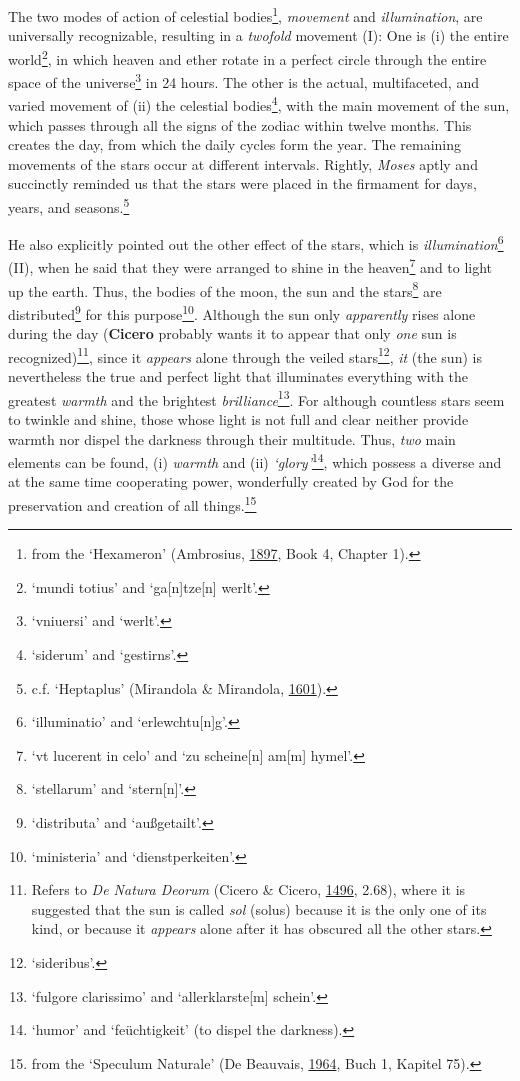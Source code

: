 \documentclass[
]{article}
\begin{document}
The two modes of action of celestial bodies\footnote{from the
  `Hexameron' (Ambrosius,
  \href{https://books.google.com/books?id=L1DbnAAACAAJ}{1897}, Book 4,
  Chapter 1).}, \emph{movement} and \emph{illumination}, are universally
recognizable, resulting in a \emph{twofold} movement (I): One is (i) the
entire world\footnote{`mundi totius' and `ga{[}n{]}tze{[}n{]} werlt'.},
in which heaven and ether rotate in a perfect circle through the entire
space of the universe\footnote{`vniuersi' and `werlt'.} in 24 hours. The
other is the actual, multifaceted, and varied movement of (ii) the
celestial bodies\footnote{`siderum' and `gestirns'.}, with the main
movement of the sun, which passes through all the signs of the zodiac
within twelve months. This creates the day, from which the daily cycles
form the year. The remaining movements of the stars occur at different
intervals. Rightly, \emph{Moses} aptly and succinctly reminded us that
the stars were placed in the firmament for days, years, and
seasons.\footnote{c.f. `Heptaplus' (Mirandola \& Mirandola,
  \href{https://doi.org/10.3931/e-rara-61217}{1601}).}

He also explicitly pointed out the other effect of the stars, which is
\emph{illumination}\footnote{`illuminatio' and `erlewchtu{[}n{]}g'.}
(II), when he said that they were arranged to shine in the
heaven\footnote{`vt lucerent in celo' and `zu scheine{[}n{]} am{[}m{]}
  hymel'.} and to light up the earth. Thus, the bodies of the moon, the
sun and the stars\footnote{`stellarum' and `stern{[}n{]}'.} are
distributed\footnote{`distributa' and `außgetailt'.} for this
purpose\footnote{`ministeria' and `dienstperkeiten'.}. Although the sun
only \emph{apparently} rises alone during the day (\textbf{Cicero}
probably wants it to appear that only \emph{one} sun is
recognized)\footnote{Refers to \emph{De Natura Deorum} (Cicero \&
  Cicero, \href{https://doi.org/10.3931/e-rara-89116}{1496}, 2.68),
  where it is suggested that the sun is called \emph{sol} (solus)
  because it is the only one of its kind, or because it \emph{appears}
  alone after it has obscured all the other stars.}, since it
\emph{appears} alone through the veiled stars\footnote{`sideribus'.},
\emph{it} (the sun) is nevertheless the true and perfect light that
illuminates everything with the greatest \emph{warmth} and the brightest
\emph{brilliance}\footnote{`fulgore clarissimo' and `allerklarste{[}m{]}
  schein'.}. For although countless stars seem to twinkle and shine,
those whose light is not full and clear neither provide warmth nor
dispel the darkness through their multitude. Thus, \emph{two} main
elements can be found, (i) \emph{warmth} and (ii)
\emph{`glory'}\footnote{`humor' and `feüchtigkeit' (to dispel the
  darkness).}, which possess a diverse and at the same time cooperating
power, wonderfully created by God for the preservation and creation of
all things.\footnote{from the `Speculum Naturale' (De Beauvais,
  \href{https://nbn-resolving.org/urn:nbn:de:hbz:061:1-20612}{1964},
  Buch 1, Kapitel 75).}
\end{document}
